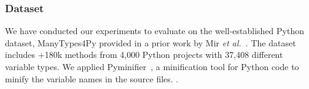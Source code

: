 

\subsubsection*{Dataset} We have conducted our experiments to evaluate {\tool} on the
well-established Python dataset, ManyTypes4Py provided in a prior work
by Mir {\em et al.}~\cite{mir2021manytypes4py}. The dataset includes
+180k methods from 4,000 Python projects with 37,408 different
variable types. We applied Pyminifier~\cite{pyminifier}, a
minification tool for Python code to minify the variable names in the
source files. {}.

